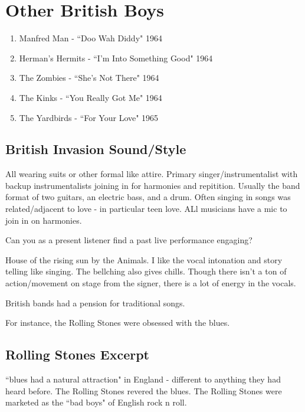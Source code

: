 \documentclass[12pt, a4paper, twoside, openright, titlepage]{book}
\begin{document}
\section{Other British Boys}

\begin{enumerate}
    \item Manfred Man - ``Doo Wah Diddy" 1964
    \item Herman's Hermits - ``I'm Into Something Good" 1964
    \item The Zombies - ``She's Not There" 1964
    \item The Kinks - ``You Really Got Me" 1964
    \item The Yardbirds - ``For Your Love" 1965
\end{enumerate}

\subsection{British Invasion Sound/Style}

All wearing suits or other formal like attire. Primary singer/instrumentalist with backup instrumentalists joining in for harmonies and repitition. Usually the band format of two guitars, an electric bass, and a drum. Often singing in songs was related/adjacent to love - in particular teen love. ALl musicians have a mic to join in on harmonies.

\begin{qst}{}{}
    Can you as a present listener find a past live performance engaging?
\end{qst}


\begin{eg}{}{}
    House of the rising sun by the Animals. I like the vocal intonation and story telling like singing. The bellching also gives chills. Though there isn't a ton of action/movement on stage from the signer, there is a lot of energy in the vocals.
\end{eg}

British bands had a pension for traditional songs.


For instance, the Rolling Stones were obsessed with the blues.

\subsection{Rolling Stones Excerpt}

``blues had a natural attraction" in England - different to anything they had heard before. The Rolling Stones revered the blues. The Rolling Stones were marketed as the ``bad boys" of English rock n roll.
\end{document}

